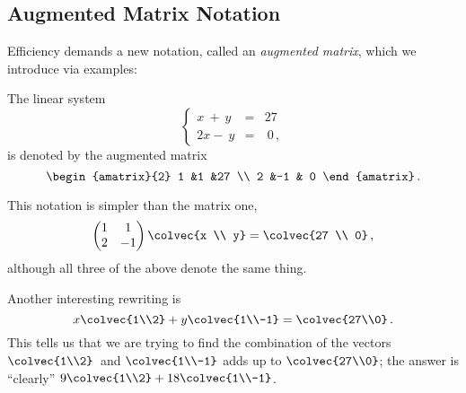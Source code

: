 \subsection{Augmented Matrix Notation}

Efficiency demands a new notation, called an \hypertarget{augmented_matrix}{\emph{augmented matrix}},
which we  introduce via examples: 

The linear system
\[\left\{ 
\begin{array}{rcr}
	x\ +\ y & = & 27 \\
	2x-\ y & = &\  0\, ,
\end{array}\right.
\]
is denoted by the augmented matrix
\[
\begin{amatrix}{2}
1 &1 &27 \\ 2 &-1 & 0
\end{amatrix}\, .
\]

\noindent
This notation is  simpler than the matrix one, 
\begin{equation*}
    \begin{pmatrix}
      1             &1  \\
      2             &-1
    \end{pmatrix}
  \colvec{x \\ y}
  =
  \colvec{27 \\ 0}\, ,
\end{equation*}
although all three of the above denote the same thing. 


\noindent
Another interesting rewriting is
\[
x\colvec{1\\2}+y\colvec{1\\-1}=\colvec{27\\0}\, .
\]
This tells us that we are trying to find the combination of the vectors $\colvec{1\\2}$~and $\colvec{1\\-1}$ adds up to $\colvec{27\\0}$; 
 the answer is  ``clearly'' $9\colvec{1\\2}+18\colvec{1\\-1}$.\\[1mm]


